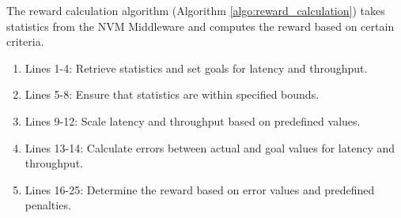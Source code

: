 The reward calculation algorithm (Algorithm \ref{algo:reward_calculation}) takes statistics from the NVM Middleware and computes the reward based on certain criteria.

\begin{enumerate}
  \item Lines 1-4: Retrieve statistics and set goals for latency and throughput.
  \item Lines 5-8: Ensure that statistics are within specified bounds.
  \item Lines 9-12: Scale latency and throughput based on predefined values.
  \item Lines 13-14: Calculate errors between actual and goal values for latency and throughput.
  \item Lines 16-25: Determine the reward based on error values and predefined penalties.
\end{enumerate}




